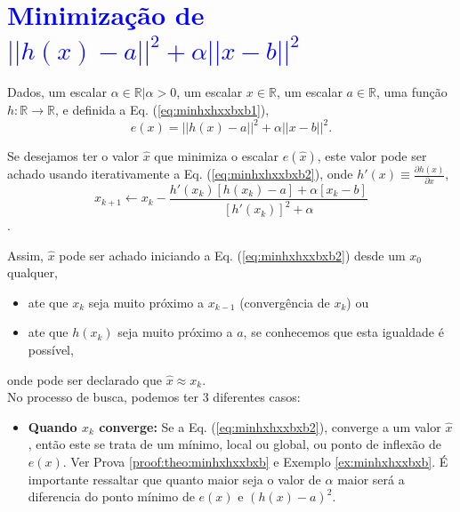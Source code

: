 
\section{\textcolor{blue}{Minimização de $||h(x)-a||^2+\alpha ||x-b||^2$}}

\begin{theorem}\label{theo:minhxhxxbxb}
Dados,
um escalar $\alpha \in \mathbb{R} | \alpha > 0$, 
um escalar $x \in \mathbb{R}$, 
um escalar $a \in \mathbb{R}$,  
uma função $h:\mathbb{R} \rightarrow \mathbb{R}$, e 
definida a Eq. (\ref{eq:minhxhxxbxb1}),
\begin{equation}\label{eq:minhxhxxbxb1}
e(x)=||h(x)-a||^2+\alpha ||x-b||^2.
\end{equation}

Se desejamos ter o valor $\hat{x}$ que minimiza o escalar $e(\hat{x})$,
este valor pode ser achado usando iterativamente a Eq. (\ref{eq:minhxhxxbxb2}),
onde  $h'(x)\equiv \frac{\partial h(x)}{\partial x}$,
\begin{equation}\label{eq:minhxhxxbxb2}
x_{k+1} \leftarrow x_k-
\frac{ h'(x_k) \left[h(x_k)-a\right]+\alpha\left[ x_k-b\right]}{\left[h'(x_k)\right]^2+\alpha}
\end{equation}.

Assim, $\hat{x}$ pode ser achado iniciando a Eq. (\ref{eq:minhxhxxbxb2}) desde um 
$x_{0}$ qualquer, 
\begin{itemize}
    \item ate que $x_{k}$ seja muito próximo a $x_{k-1}$ (convergência de $x_{k}$) ou
    \item ate que $h(x_{k})$ seja muito próximo a $a$, 
    se conhecemos que esta igualdade é possível,
\end{itemize}
onde pode ser declarado que $\hat{x} \approx x_{k}$.\\

No processo de busca, podemos ter 3 diferentes casos:
\begin{itemize}
\item \textbf{Quando $x_{k}$ converge:}  
Se a Eq. (\ref{eq:minhxhxxbxb2}),  converge a um valor $\hat{x}$, então este se trata de 
um mínimo, local ou global, ou ponto de inflexão de $e(x)$. 
Ver Prova \ref{proof:theo:minhxhxxbxb} e Exemplo \ref{ex:minhxhxxbxb}.
\'E importante ressaltar que quanto maior seja o valor de $\alpha$ maior
será a diferencia do ponto mínimo de $e(x)$ e $(h(x)-a)^2$.



\end{itemize}
\end{theorem}
